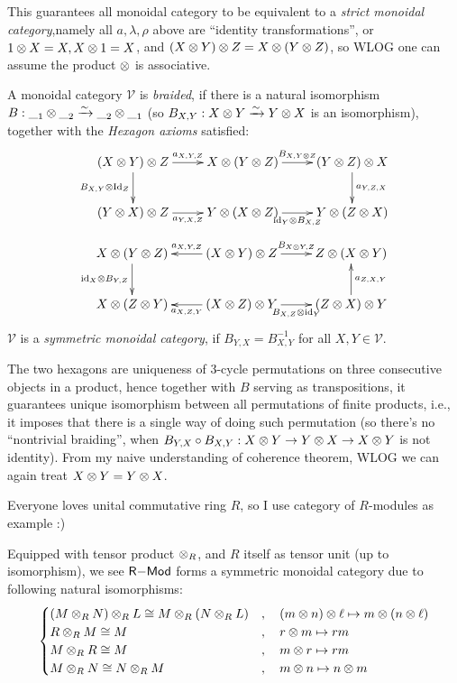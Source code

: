 \documentclass{article}
\begin{document}
This guarantees all monoidal category to be equivalent to a \emph{strict monoidal category},namely all $a,\lambda,\rho$ above are ``identity transformations'', or $1\otimes X=X,X\otimes 1=X$, and $(X\otimes Y)\otimes Z=X\otimes (Y\otimes Z)$, so WLOG one can assume the product $\otimes$ is associative.

\begin{defn}
    A monoidal category $\mathcal{V}$ is \emph{braided}, if there is a natural isomorphism $B:\__{1} \otimes \__{2}\xrightarrow{\sim} \__{2}\otimes \__{1}$ (so $B_{X,Y}:X\otimes Y\xrightarrow{\sim}Y\otimes X$ is an isomorphism), together with the \emph{Hexagon axioms} satisfied:
    \[\xymatrix{
        (X\tensor Y)\tensor Z \ar[r]^-{a_{X,Y,Z}} \ar[d]_-{B_{X,Y}\tensor \Id_Z} & X\tensor (Y\tensor Z)\ar[r]^-{B_{X,Y\tensor Z}} & (Y\tensor Z)\tensor X \ar[d]^-{a_{Y,Z,X}}\\
        (Y\tensor X)\tensor Z \ar[r]_-{a_{Y,X,Z}} & Y\tensor (X\tensor Z) \ar[r]_-{\id_Y\tensor B_{X,Z}} & Y\tensor (Z\tensor X)
    }\]
    \[\xymatrix{
        X\tensor (Y\tensor Z) \ar[d]_-{\id_X\tensor B_{Y,Z}} & (X\tensor Y)\tensor Z \ar[l]_-{a_{X,Y,Z}} \ar[r]^-{B_{X\tensor Y,Z}} & Z\tensor (X\tensor Y)\\
        X\tensor (Z\tensor Y) & (X\tensor Z)\tensor Y \ar[l]^-{a_{X,Z,Y}} \ar[r]_-{B_{X,Z}\tensor \id_Y} & (Z\tensor X)\tensor Y \ar[u]_-{a_{Z,X,Y}}
    }\]
    $\mathcal{V}$ is a \emph{symmetric monoidal category}, if $B_{Y,X}=B_{X,Y}^{-1}$ for all $X,Y\in\mathcal{V}$.
\end{defn}
The two hexagons are uniqueness of 3-cycle permutations on three consecutive objects in a product, hence together with $B$ serving as transpositions, it guarantees unique isomorphism between all permutations of finite products, i.e., it imposes that there is a single way of doing such permutation (so there's no ``nontrivial braiding'', when $B_{Y,X}\circ B_{X,Y}:X\otimes Y\rightarrow Y\otimes X\rightarrow X\otimes Y$ is not identity). From my naive understanding of coherence theorem, WLOG we can again treat $X\otimes Y=Y\otimes X$.

\begin{exmp}
    Everyone loves unital commutative ring $R$, so I use category of $R$-modules as example :)
    
    Equipped with tensor product $\otimes_R$, and $R$ itself as tensor unit (up to isomorphism), we see $\mathsf{R}\mathrm{-}\mathsf{Mod}$ forms a symmetric monoidal category due to following natural isomorphisms:
    \[\begin{cases}
        (M\otimes_R N)\otimes_R L\cong M\otimes_R (N\otimes_R L) &, \quad(m\otimes n)\otimes \ell\mapsto m\otimes (n\otimes \ell)\\
        R\otimes_R M\cong M &,\quad  r\otimes m\mapsto rm\\
        M\otimes_R R\cong M &,\quad  m\otimes r\mapsto rm\\
        M\otimes_R N\cong N\otimes_R M&,\quad m\otimes n\mapsto n\otimes m
    \end{cases}\]
\end{exmp}
\end{document}
